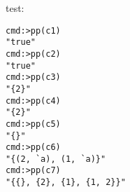 \documentclass{../src/led_doc}
\begin{document}
\begin{ledDef}
\end{ledDef}

\begin{ledDef}
\end{ledDef}

\begin{ledDef}
\end{ledDef}

\begin{ledDef}
\end{ledDef}

\begin{ledDef}
\end{ledDef}

\begin{ledDef}
\end{ledDef}

\begin{ledDef}
\end{ledDef}

\begin{ledCmnt}
test:
\begin{verbatim}
cmd:>pp(c1)
"true"
cmd:>pp(c2)
"true"
cmd:>pp(c3)
"{2}"
cmd:>pp(c4)
"{2}"
cmd:>pp(c5)
"{}"
cmd:>pp(c6)
"{(2, `a), (1, `a)}"
cmd:>pp(c7)
"{{}, {2}, {1}, {1, 2}}"
\end{verbatim}
\end{ledCmnt}
\end{document}
